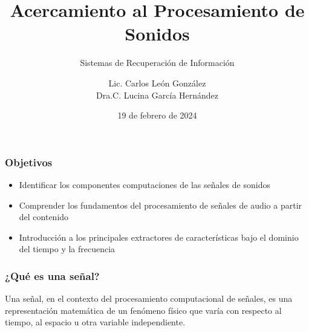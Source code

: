 \documentclass[
10pt, %
aspectratio=169, %
]{beamer}
\title[Short Title]{Acercamiento al Procesamiento de Sonidos}
\subtitle{Sistemas de Recuperación de Información}
\author{Lic. Carlos León González \\ Dra.C. Lucina García Hernández}
\institute[UC]{Facultad de Matem\'atica y Computaci\'on \\ Universidad de La Habana \\ \smallskip }
\date{19 de febrero de  2024} %
\begin{document}
	
	
	
	\begin{frame}
		\titlepage
	\end{frame}
	
	\begin{frame}
		
		\frametitle{Objetivos}
		
		\begin{itemize}
			\item Identificar los componentes computaciones de las señales de sonidos
			
			\item Comprender los fundamentos del procesamiento de señales de audio a partir del contenido
			
			\item Introducción a los principales extractores de características bajo el dominio del tiempo y la frecuencia
			
		\end{itemize}
		
	\end{frame}
	
	\begin{frame}
		
		\frametitle{¿Qué es una señal?}
		
		\begin{alertblock}{}
			Una señal, en el contexto del procesamiento computacional de señales, es una representación matemática de un fenómeno físico que varía con respecto al tiempo, al espacio u otra variable independiente. 
		\end{alertblock}
		
	\end{frame}
	
\end{document}
